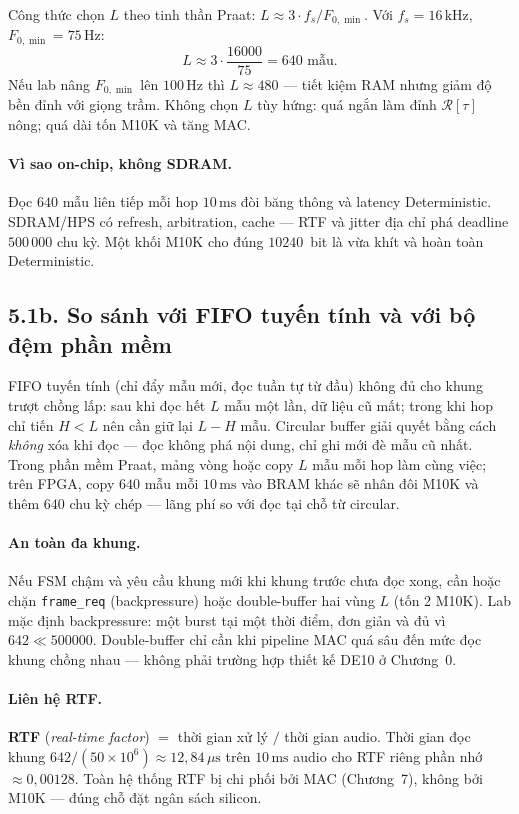 Công thức chọn $L$ theo tinh thần Praat: $L\approx 3\cdot f_s/F_{0,\min}$. Với $f_s=16\,\text{kHz}$, $F_{0,\min}=75\,\text{Hz}$:
\[
L\approx 3\cdot\frac{16000}{75}=640\text{ mẫu}.
\]
Nếu lab nâng $F_{0,\min}$ lên $100\,\text{Hz}$ thì $L\approx 480$ --- tiết kiệm RAM nhưng giảm độ bền đỉnh với giọng trầm. Không chọn $L$ tùy hứng: quá ngắn làm đỉnh $\mathcal{R}[\tau]$ nông; quá dài tốn M10K và tăng MAC.

\paragraph{Vì sao on-chip, không SDRAM.} Đọc $640$ mẫu liên tiếp mỗi hop $10\,\text{ms}$ đòi băng thông và latency Deterministic. SDRAM/HPS có refresh, arbitration, cache --- RTF và jitter địa chỉ phá deadline $500\,000$ chu kỳ. Một khối M10K cho đúng $10240$~bit là vừa khít và hoàn toàn Deterministic.


\subsection*{5.1b. So sánh với FIFO tuyến tính và với bộ đệm phần mềm}

FIFO tuyến tính (chỉ đẩy mẫu mới, đọc tuần tự từ đầu) không đủ cho khung trượt chồng lấp: sau khi đọc hết $L$ mẫu một lần, dữ liệu cũ mất; trong khi hop chỉ tiến $H<L$ nên cần giữ lại $L-H$ mẫu. Circular buffer giải quyết bằng cách \emph{không} xóa khi đọc --- đọc không phá nội dung, chỉ ghi mới đè mẫu cũ nhất. Trong phần mềm Praat, mảng vòng hoặc copy $L$ mẫu mỗi hop làm cùng việc; trên FPGA, copy $640$ mẫu mỗi $10\,\text{ms}$ vào BRAM khác sẽ nhân đôi M10K và thêm $640$ chu kỳ chép --- lãng phí so với đọc tại chỗ từ circular.

\paragraph{An toàn đa khung.} Nếu FSM chậm và yêu cầu khung mới khi khung trước chưa đọc xong, cần hoặc chặn \texttt{frame\_req} (backpressure) hoặc double-buffer hai vùng $L$ (tốn 2 M10K). Lab mặc định backpressure: một burst tại một thời điểm, đơn giản và đủ vì $642\ll 500000$. Double-buffer chỉ cần khi pipeline MAC quá sâu đến mức đọc khung chồng nhau --- không phải trường hợp thiết kế DE10 ở Chương~0.

\paragraph{Liên hệ RTF.} \textbf{RTF} (\emph{real-time factor}) $=$ thời gian xử lý $/$ thời gian audio. Thời gian đọc khung $642/(50\times 10^{6})\approx 12{,}84\,\mu\mathrm{s}$ trên $10\,\text{ms}$ audio cho RTF riêng phần nhớ $\approx 0{,}00128$. Toàn hệ thống RTF bị chi phối bởi MAC (Chương~7), không bởi M10K --- đúng chỗ đặt ngân sách silicon.
